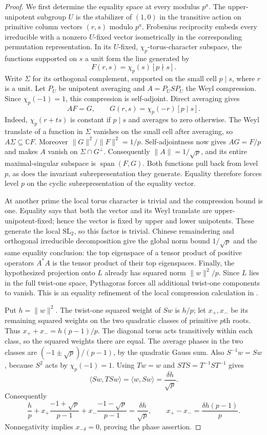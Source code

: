 \begin{proof}
We first determine the equality space at every modulus $p^a$.
The upper-unipotent subgroup $U$ is the stabilizer of $(1,0)$ in
the transitive action on primitive column vectors $(r,s)$ modulo
$p^a$.  Frobenius reciprocity embeds every irreducible with a nonzero
$U$-fixed vector isometrically in the corresponding permutation
representation.  In its $U$-fixed, $\chi_p$-torus-character subspace,
the functions supported on $s$ a unit form the line generated by
\[
 F(r,s)=\chi_p(s)[p\nmid s].
\]
Write $\Sigma$ for its orthogonal complement, supported on the small
cell $p\mid s$, where $r$ is a unit.  Let $P_U$ be unipotent averaging
and $A=P_USP_U$ the Weyl compression.  Since $\chi_p(-1)=1$, this
compression is self-adjoint.  Direct averaging gives
\[
 AF=G,\qquad G(r,s)=\chi_p(-r)[p\mid s].
\]
Indeed, $\chi_p(r+ts)$ is constant if $p\mid s$ and averages to
zero otherwise.  The Weyl translate of a function in $\Sigma$
vanishes on the small cell after averaging, so $A\Sigma\subseteq
\mathbb CF$.  Moreover $\|G\|^2/\|F\|^2=1/p$.
Self-adjointness now gives $AG=F/p$ and makes $A$ vanish on
$\Sigma\cap G^\perp$.  Consequently $\|A\|=1/\sqrt p$, and its
entire maximal-singular subspace is $\operatorname{span}(F,G)$.
Both functions pull back from level $p$, as does the invariant
subrepresentation they generate.  Equality therefore forces level
$p$ on the cyclic subrepresentation of the equality vector.

At another prime the local torus character is trivial and the
compression bound is one.  Equality says that both the vector and
its Weyl translate are upper-unipotent-fixed; hence the vector is
fixed by upper and lower unipotents.  These generate the local
$\mathrm{SL}_2$, so this factor is trivial.  Chinese remaindering and
orthogonal irreducible decomposition give the global norm bound
$1/\sqrt p$ and the same equality conclusion: the top eigenspace of
a tensor product of positive operators $A^*A$ is the tensor product
of their top eigenspaces.  Finally, the hypothesized projection onto
$L$ already has squared norm $\|w\|^2/p$.  Since $L$ lies in the
full twist-one space, Pythagoras forces all additional twist-one
components to vanish.  This is an equality refinement of the local
compression calculation in \cite[Lemma~4.1]{SchopierayDimensionBlock}.

Put $h=\|w\|^2$.  The twist-one squared weight of $Sw$ is $h/p$;
let $x_+,x_-$ be its remaining squared weights on the two quadratic
classes of primitive $p$th roots.  Thus
$x_++x_-=h(p-1)/p$.  The diagonal torus acts transitively within
each class, so the squared weights there are equal.  The average
phases in the two classes are $(-1\pm\sqrt p)/(p-1)$, by the
quadratic Gauss sum.  Also $S^{-1}w=Sw$, because $S^2$ acts by
$\chi_p(-1)=1$.  Using $Tw=w$ and
$STS=T^{-1}ST^{-1}$ gives
\[
 \langle Sw,TSw\rangle=\langle w,Sw\rangle
     =\frac{\delta h}{\sqrt p}.
\]
Consequently
\[
 \frac hp+x_+\frac{-1+\sqrt p}{p-1}
            +x_-\frac{-1-\sqrt p}{p-1}
       =\frac{\delta h}{\sqrt p},
 \qquad x_+-x_-=\frac{\delta h(p-1)}p.
\]
Nonnegativity implies $x_{-\delta}=0$, proving the phase assertion.
\end{proof}

